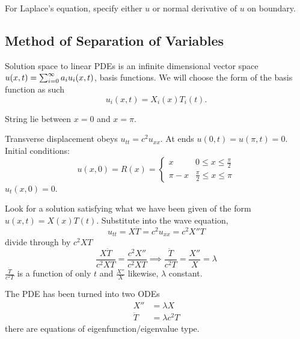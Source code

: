 \documentclass[10pt, a4paper]{article}
\begin{document}
For Laplace's equation,
specify either $u$ or normal derivative of $u$ on boundary.

\subsection{Method of Separation of Variables}
Solution space to linear PDEs is an infinite dimensional vector space
$u(x, t) = \infsum[i = 0] a_iu_i(x, t)$,
basis functions.
We will choose the form of the basis function as such
\[
u_i(x, t) = X_i(x)T_i(t).
\]

\begin{example}
    String lie between $x = 0$ and $x = \pi$.

    Transverse displacement obeys $u_{tt} = c ^ 2u_{xx}$.
    At ends $u(0, t) = u(\pi, t) = 0$.
    Initial conditions:
    \[
    u(x, 0) = R(x) = \begin{cases}
        x & 0 \leq x \leq \frac{\pi}{2} \\
        \pi - x & \frac{\pi}{2} \leq x \leq \pi
    \end{cases}
    \]
    $u_t(x, 0) = 0$.

    \begin{solution}
        Look for a solution satisfying what we have been given of the form $u(x, t) = X(x)T(t)$.
        Substitute into the wave equation,
        \[
        u_{tt} = X\ddot{T} = c ^ 2u_{xx} = c ^ 2X''T
        \]
        divide through by $c ^ 2XT$
        \[
        \frac{X\ddot{T}}{c ^ 2XT} = \frac{c ^ 2X''}{c ^ 2XT} \implies \frac{\ddot{T}}{c ^ 2T} = \frac{X''}{X} = \lambda
        \]
        $\frac{\ddot{T}}{c ^ 2T}$ is a function of only $t$ and $\frac{X''}{X}$ likewise,
        $\lambda$ constant.

        The PDE has been turned into two ODEs
        \begin{align*}
            X'' &= \lambda X \\
            \ddot{T} &= \lambda c ^ 2T
        \end{align*}
        there are equations of eigenfunction/eigenvalue type.
    \end{solution}
\end{example}
\end{document}
